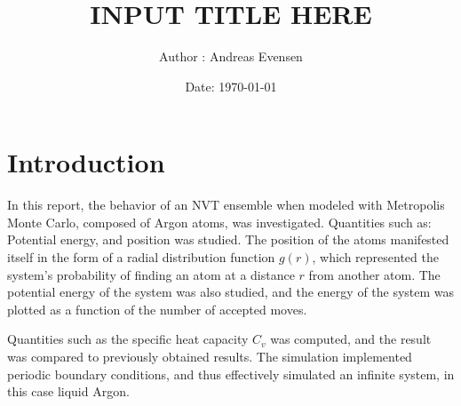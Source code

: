 \documentclass[a4paper]{article}
\title{INPUT TITLE HERE}
\author{Author : Andreas Evensen}
\date{Date: \today}
\newcommand{\newparagraph}{\vspace{.5cm}\noindent}
\begin{document}


\newpage
{}
\setcounter{page}{1}
\newpage
\tableofcontents
\newpage
{}

\section*{Introduction}
In this report, the behavior of an NVT ensemble when modeled with Metropolis Monte Carlo, composed of Argon atoms, was investigated. Quantities such as: Potential energy, and position was studied.
The position of the atoms manifested itself in the form of a radial distribution function $g(r)$, which represented the system's probability of finding an atom at a distance $r$ from another atom.
The potential energy of the system was also studied, and the energy of the system was plotted as a function of the number of accepted moves.

\newparagraph
Quantities such as the specific heat capacity $C_v$ was computed, and the result was compared to previously obtained results.
The simulation implemented periodic boundary conditions, and thus effectively simulated an infinite system, in this case liquid Argon.
\end{document}
